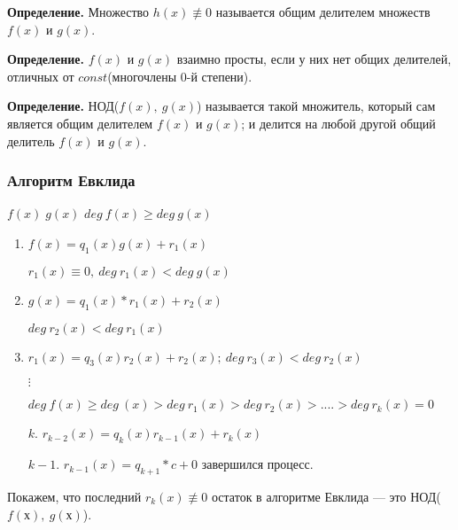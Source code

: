 \documentclass{article}
\begin{document}
    \textbf{Определение.} Множество \(h(x) \not \equiv 0\) называется общим делителем множеств \(f(x)\) и \(g(x)\).
    
    \textbf{Определение.} \(f(x)\) и \(g(x)\) взаимно просты, если у них нет общих делителей, отличных от \(const\)(многочлены 0-й степени).
    
    \textbf{Определение.} НОД(\(f(x),\ g(x)\)) называется такой множитель, который сам является общим делителем \(f(x)\) и \(g(x)\); и делится на любой другой общий делитель \(f(x)\) и \(g(x)\).
    
    \subsubsection{Алгоритм Евклида}
    
    \(f(x)\;g(x)\)
    \(deg\ f(x) \geq deg\ g(x)\)

    \begin{enumerate}
        \item \(f(x) = q_1(x)g(x) + r_1(x)\)
        
        \(r_1(x) \equiv 0,\ deg\ r_1(x) < deg\ g(x)\)
        \item \(g(x) = q_1(x) * r_1(x) + r_2(x)\)
        
        \(deg\ r_2(x) < deg\ r_1(x)\)

        \item \(r_1(x) = q_3(x)r_2(x) + r_2(x);\ deg\ r_3(x) < deg\ r_2(x)\)
        
        \(\vdots\)
        
        \( deg\ f(x) \geq deg\ (x) > deg\ r_{1}(x) > deg\ r_2 (x) > .... > deg\ r_{k}(x) = 0\)
    
        \item[$k$.] \(r_{k-2}(x)=q_k(x)r_{k-1}(x)+r_k(x)\)
        \item[\(k-1\).] \(r_{k-1}(x) = q_{k+1} * c + 0\) завершился процесс.
        
    \end{enumerate}

    Покажем, что последний \(r_{k}(x) \not \equiv 0\) остаток в алгоритме Евклида — это НОД(\(f(х),\ g(х)\)).
\end{document}
